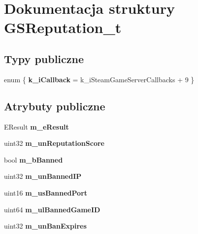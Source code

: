 \hypertarget{struct_g_s_reputation__t}{}\section{Dokumentacja struktury G\+S\+Reputation\+\_\+t}
\label{struct_g_s_reputation__t}
\subsection*{Typy publiczne}
\begin{DoxyCompactItemize}
\item 
\mbox{\label{struct_g_s_reputation__t_a73125e44b4cf48f49aa9c2b59ef0ef2b}} 
enum \{ {\bfseries k\+\_\+i\+Callback} = k\+\_\+i\+Steam\+Game\+Server\+Callbacks + 9
 \}
\end{DoxyCompactItemize}
\subsection*{Atrybuty publiczne}
\begin{DoxyCompactItemize}
\item 
\mbox{\label{struct_g_s_reputation__t_a38d6f446a3486f1c3d715fb24f5065ed}} 
E\+Result {\bfseries m\+\_\+e\+Result}
\item 
\mbox{\label{struct_g_s_reputation__t_abd1ff33fbf43e257a5e1d7a9c11f52a7}} 
uint32 {\bfseries m\+\_\+un\+Reputation\+Score}
\item 
\mbox{\label{struct_g_s_reputation__t_abe9c80b9a22286c1887f13bdd347a021}} 
bool {\bfseries m\+\_\+b\+Banned}
\item 
\mbox{\label{struct_g_s_reputation__t_a12aa547e5c6b984ed869c516dd94f524}} 
uint32 {\bfseries m\+\_\+un\+Banned\+IP}
\item 
\mbox{\label{struct_g_s_reputation__t_a4f16ac98752c4dc79c28231110260a15}} 
uint16 {\bfseries m\+\_\+us\+Banned\+Port}
\item 
\mbox{\label{struct_g_s_reputation__t_a04bd8436228d5deefeced4784973e6ce}} 
uint64 {\bfseries m\+\_\+ul\+Banned\+Game\+ID}
\item 
\mbox{\label{struct_g_s_reputation__t_a86eaac93872e9a3513c77150231b3c2e}} 
uint32 {\bfseries m\+\_\+un\+Ban\+Expires}
\end{DoxyCompactItemize}


